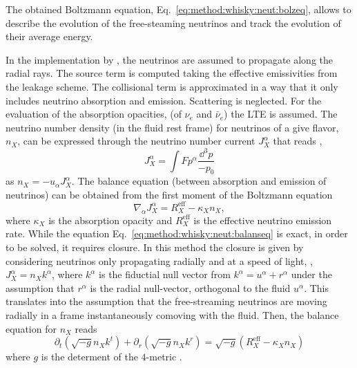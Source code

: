 

The obtained Boltzmann equation, Eq.~\eqref{eq:method:whisky:neut:bolzeq}, allows to describe
the evolution of the free-steaming neutrinos and track the evolution of their average energy.

In the implementation by \citet{Radice:2016dwd,Radice:2018pdn}, 
the neutrinos are assumed to propagate along the radial rays. 
The source term is computed taking the effective emissivities from the leakage scheme.
The collisional term is approximated in a way that it only includes neutrino absorption and emission. Scattering is neglected.
For the evaluation of the absorption opacities, (of $\nu_{e}$ and $\bar{\nu}_{e}$) the 
\ac{LTE} is assumed.
%
The neutrino number density (in the fluid rest frame) for neutrinos of a give flavor, $n_X$, 
can be expressed through the neutrino number current $J_{X}^{\alpha}$ that reads \citep{Lindquist:1966},
%
\begin{equation}
J_{X}^{\alpha} = \int F p^{\alpha} \frac{\dd^3 p}{-p_0}
\end{equation}
%
as $n_X = - u_{\alpha} J_{X}^{\alpha}$.
%
The balance equation (between absorption and emission of neutrinos) can be obtained from the 
first moment of the Boltzmann equation \cite{Thorne:1981,Shibata:2011kx}
%
\begin{equation}
\label{eq:method:whisky:neut:balanseq}
\nabla_{\alpha}J_{X}^{\alpha} = R_{X}^{\text{eff}} - \kappa_X n_X,
\end{equation}
%
where $\kappa_X$ is the absorption opacity and $R_X^{\text{eff}}$ is the effective neutrino emission rate.
%
While the equation Eq.~\eqref{eq:method:whisky:neut:balanseq} is exact, in order to be solved, 
it requires closure. 
In this method the closure is given by considering neutrinos only 
propagating radially and at a speed of light, \eg, 
%
$J_{X}^{\alpha} = n_X k^{\alpha}$, 
%
where $k^{\alpha}$ is the fiductial null vector from 
$k^{\alpha} = u^{\alpha} + r^{\alpha}$ %
under the assumption that $r^{\alpha}$ is the radial null-vector, orthogonal to the fluid $u^{\alpha}$.
This translates into the assumption that the free-streaming neutrinos are 
moving radially in a frame instantaneously comoving with the fluid.
%
Then, the balance equation for $n_X$ reads
%
\begin{equation}
\label{eq:mehtod:whisky:neut:balanseq2}
\partial_t(\sqrt{-g}n_X k^t) + \partial_r(\sqrt{-g}n_X k^r) = \sqrt{-g}(R^{\text{eff}}_{X} - \kappa_X n_X)
\end{equation}
%
where $g$ is the determent of the $4$-metric .


